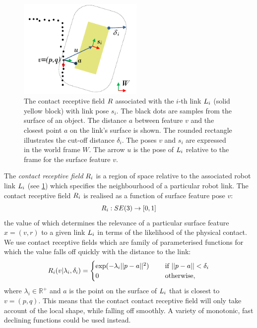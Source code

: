 \begin{figure}[t]
\centerline{\includegraphics[width=6cm]{resources/contact}}
\caption[Contact receptive field]{The contact receptive field $R$ associated with the $i$-th link $L_i$ (solid yellow block) with link pose $s_i$. The black dots are samples from the surface of an object. The distance $a$ between feature $v$ and the closest point $a$ on the link's surface is shown. The rounded rectangle illustrates the cut-off distance $\delta_i$. The poses $v$ and $s_i$ are expressed in the world frame $W$. The arrow $u$ is the pose of $L_i$ relative to the frame for the surface feature $v$.}
\label{fig:contact_recfield}
\end{figure}

The \textit{contact receptive field} $R_i$ is a region of space relative to the associated robot link $L_i$ (see \fig\ref{fig:contact_recfield}) which specifies the neighbourhood of a particular robot link. The contact receptive field $R_i$ is realised as a function of surface feature pose $v$:
\begin{equation}
R_{i} : SE(3) \rightarrow [0, 1]
\label{eq:contact_recfield_model}
\end{equation}
the value of which determines the relevance of a particular surface feature $x = (v, r)$ to a given link $L_i$ in terms of the likelihood of the physical contact. We use contact receptive fields which are family of parameterised functions for which the value falls off quickly with the distance to the link:
\begin{equation}
R_{i}(v|\lambda_i,\delta_i) = \begin{cases}\exp(-\lambda_i ||p-a||^2) \quad &\textnormal{ if } ||p-a|| < \delta_i\\
0 \quad &\textnormal{ otherwise},\end{cases}
\label{eq:contact_recfield_func}
\end{equation}
where $\lambda_i \in \mathbb R^{+}$ and $a$ is the point on the surface of $L_i$ that is closest to $v = (p, q)$. This means that the contact contact receptive field will only take account of the local shape, while falling off smoothly. A variety of monotonic, fast declining functions could be used instead.


